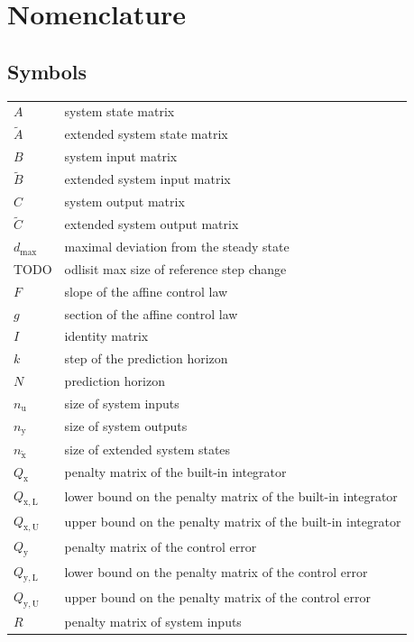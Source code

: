 \documentclass[preprint,12pt]{elsarticle}
\begin{document}
\section*{Nomenclature}

\subsection*{Symbols}
\begin{center}
	\begin{tabular}{ l l }
$A$ & system state matrix \\
$\widetilde{A}$ & extended system state matrix \\
$B$ & system input matrix \\
$\widetilde{B}$ & extended system input matrix \\
$C$ & system output matrix \\
$\widetilde{C}$ & extended system output matrix \\
$d_{\max}$ & maximal deviation from the steady state \\
TODO & odlisit max size of reference step change \\
$F$ & slope of the affine control law \\
$g$ & section of the affine control law \\
$I$ & identity matrix \\	
$k$ & step of the prediction horizon \\
$N$ & prediction horizon \\
$n_{\mathrm{u}}$ & size of system inputs \\
$n_{\mathrm{y}}$ & size of system outputs \\
$n_{\widetilde{\mathrm{x}}}$ & size of extended system states \\
$Q_{\mathrm{x}}$ & penalty matrix of the built-in integrator \\
$Q_{\mathrm{x,L}}$ & lower bound on the penalty matrix of the built-in integrator \\
$Q_{\mathrm{x,U}}$ & upper bound on the penalty matrix of the built-in integrator \\
$Q_{\mathrm{y}}$ & penalty matrix of the control error \\
$Q_{\mathrm{y,L}}$ & lower bound on the penalty matrix of the control error \\
$Q_{\mathrm{y,U}}$ & upper bound on the penalty matrix of the control error \\
$R$ & penalty matrix of system inputs \\

\end{tabular}
\end{center}
\end{document}
